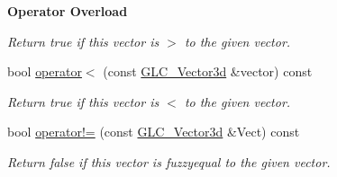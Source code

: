 \begin{Indent}{\bf Operator Overload}
\begin{DoxyCompactItemize}
\begin{DoxyCompactList}\small\item\em Return true if this vector is $>$ to the given vector. \end{DoxyCompactList}\item 
bool \hyperlink{class_g_l_c___vector3d_a36543441993b10ae6f8ecd6a7858fa39}{operator$<$} (const \hyperlink{class_g_l_c___vector3d}{G\-L\-C\-\_\-\-Vector3d} \&vector) const 
\begin{DoxyCompactList}\small\item\em Return true if this vector is $<$ to the given vector. \end{DoxyCompactList}\item 
bool \hyperlink{class_g_l_c___vector3d_a9991813db6ba2b49c7d0ca2b3e0a87b8}{operator!=} (const \hyperlink{class_g_l_c___vector3d}{G\-L\-C\-\_\-\-Vector3d} \&Vect) const 
\begin{DoxyCompactList}\small\item\em Return false if this vector is fuzzyequal to the given vector. \end{DoxyCompactList}\end{DoxyCompactItemize}
\end{Indent}
